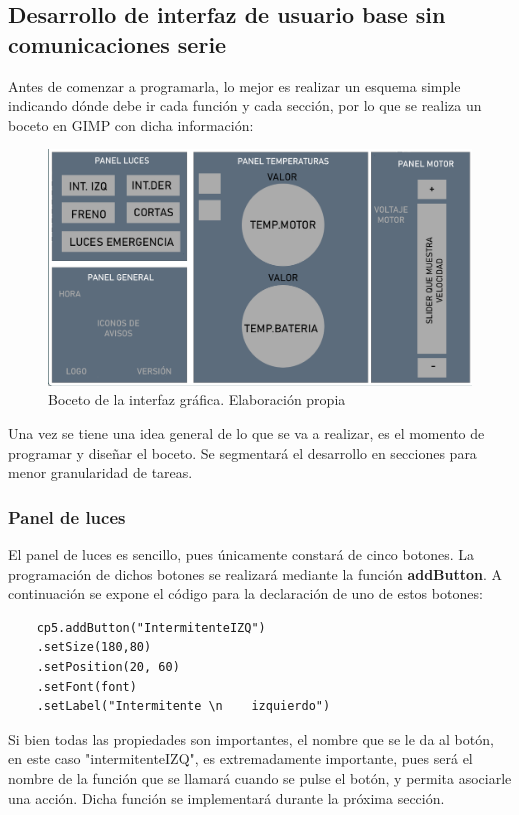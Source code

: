 \subsection{Desarrollo de interfaz de usuario base sin comunicaciones serie}


Antes de comenzar a programarla, lo mejor es realizar un esquema simple indicando dónde debe ir cada función y cada sección, por lo que se realiza un boceto en GIMP con dicha información:

\begin{figure}[H]
    \centering
    \includegraphics[width=1\textwidth]{imagenes/cargui_base.png}
    \caption{Boceto de la interfaz gráfica. Elaboración propia}
\end{figure}

Una vez se tiene una idea general de lo que se va a realizar, es el momento de programar y diseñar el boceto. Se segmentará el desarrollo en secciones para menor granularidad de tareas.

\subsubsection{Panel de luces}

El panel de luces es sencillo, pues únicamente constará de cinco botones. La programación de dichos botones se realizará mediante la función \textbf{addButton}. A continuación se expone el código para la declaración de uno de estos botones:

\begin{verbatim}
    cp5.addButton("IntermitenteIZQ")
    .setSize(180,80)
    .setPosition(20, 60)
    .setFont(font)
    .setLabel("Intermitente \n    izquierdo")
\end{verbatim}

Si bien todas las propiedades son importantes, el nombre que se le da al botón, en este caso "intermitenteIZQ", es extremadamente importante, pues será el nombre de la función que se llamará cuando se pulse el botón, y permita asociarle una acción. Dicha función se implementará durante la próxima sección.

